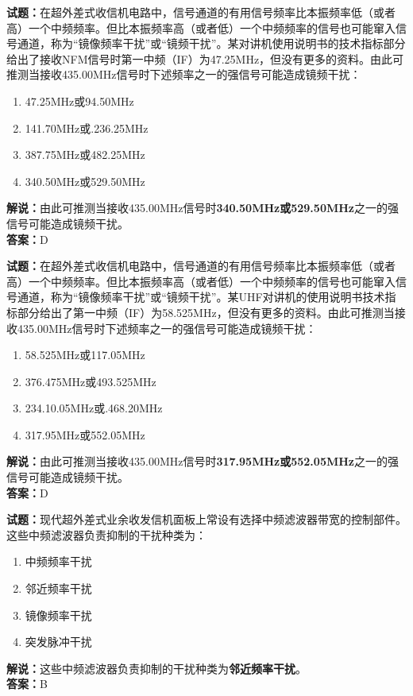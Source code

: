 \documentclass{ctexbook}
\begin{document}
\bigskip


\noindent\textbf{试题：}在超外差式收信机电路中，信号通道的有用信号频率比本振频率低（或者高）一个中频频率。但比本振频率高（或者低）一个中频频率的信号也可能窜入信号通道，称为“镜像频率干扰”或“镜频干扰”。某对讲机使用说明书的技术指标部分给出了接收NFM信号时第一中频（IF）为47.25\unit{\MHz}，但没有更多的资料。由此可推测当接收435.00\unit{\MHz}信号时下述频率之一的强信号可能造成镜频干扰：
\begin{enumerate}[leftmargin=3em]
\item 47.25\unit{\MHz}或94.50\unit{\MHz}
\item 141.70\unit{\MHz}或.236.25\unit{\MHz}
\item 387.75\unit{\MHz}或482.25\unit{\MHz}
\item 340.50\unit{\MHz}或529.50\unit{\MHz}
\end{enumerate}
\noindent\textbf{解说：}由此可推测当接收435.00\unit{\MHz}信号时\textbf{340.50\unit{\MHz}或529.50\unit{\MHz}}之一的强信号可能造成镜频干扰。\\\noindent\textbf{答案：}D



\bigskip


\noindent\textbf{试题：}在超外差式收信机电路中，信号通道的有用信号频率比本振频率低（或者高）一个中频频率。但比本振频率高（或者低）一个中频频率的信号也可能窜入信号通道，称为“镜像频率干扰”或“镜频干扰”。某UHF对讲机的使用说明书技术指标部分给出了第一中频（IF）为58.525\unit{\MHz}，但没有更多的资料。由此可推测当接收435.00\unit{\MHz}信号时下述频率之一的强信号可能造成镜频干扰：
\begin{enumerate}[leftmargin=3em]
\item 58.525\unit{\MHz}或117.05\unit{\MHz}
\item 376.475\unit{\MHz}或493.525\unit{\MHz}
\item 234.10.05\unit{\MHz}或.468.20\unit{\MHz}
\item 317.95\unit{\MHz}或552.05\unit{\MHz}
\end{enumerate}
\noindent\textbf{解说：}由此可推测当接收435.00\unit{\MHz}信号时\textbf{317.95\unit{\MHz}或552.05\unit{\MHz}}之一的强信号可能造成镜频干扰。\\\noindent\textbf{答案：}D




\bigskip


\noindent\textbf{试题：}现代超外差式业余收发信机面板上常设有选择中频滤波器带宽的控制部件。这些中频滤波器负责抑制的干扰种类为：
\begin{enumerate}[leftmargin=3em]
\item 中频频率干扰
\item 邻近频率干扰
\item 镜像频率干扰
\item 突发脉冲干扰
\end{enumerate}
\noindent\textbf{解说：}这些中频滤波器负责抑制的干扰种类为\textbf{邻近频率干扰}。\\\noindent\textbf{答案：}B
\end{document}

